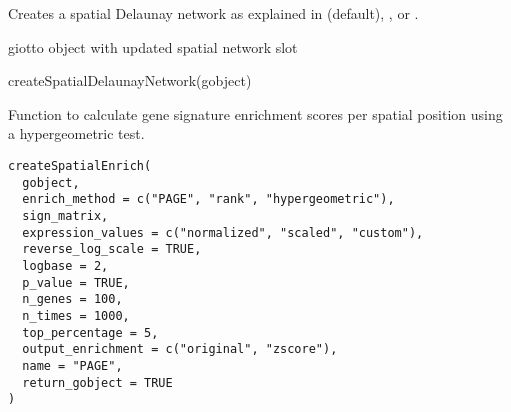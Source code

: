\documentclass[a4paper]{book}
\begin{document}
%
\begin{Details}\relax
Creates a spatial Delaunay network as explained in  (default), , or .
\end{Details}
%
\begin{Value}
giotto object with updated spatial network slot
\end{Value}
%
\begin{Examples}
\begin{ExampleCode}
    createSpatialDelaunayNetwork(gobject)
\end{ExampleCode}
\end{Examples}
%
\begin{Description}\relax
Function to calculate gene signature enrichment scores per spatial position using a hypergeometric test.
\end{Description}
%
\begin{Usage}
\begin{verbatim}
createSpatialEnrich(
  gobject,
  enrich_method = c("PAGE", "rank", "hypergeometric"),
  sign_matrix,
  expression_values = c("normalized", "scaled", "custom"),
  reverse_log_scale = TRUE,
  logbase = 2,
  p_value = TRUE,
  n_genes = 100,
  n_times = 1000,
  top_percentage = 5,
  output_enrichment = c("original", "zscore"),
  name = "PAGE",
  return_gobject = TRUE
)
\end{verbatim}
\end{Usage}
%
\end{document}
